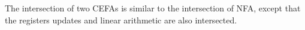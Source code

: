 \documentclass[runningheads]{llncs}
\newcommand*{\red}[1]{\textcolor{red}{#1}}
\newcommand*{\myvec}[1]{\vec{#1}}
\newcommand*{\aut}{\mathcal{A}}
\begin{document}
The intersection of two CEFAs is similar to the intersection of NFA, except that the registers updates and linear arithmetic are also intersected.
\end{document}
